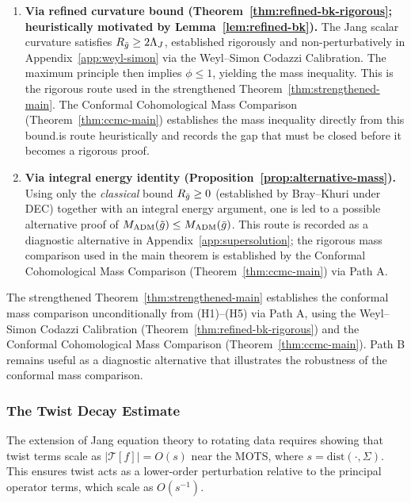 \begin{enumerate}[label=\textbf{Path \Alph*:}]
\item \textbf{Via refined curvature bound (Theorem~\ref{thm:refined-bk-rigorous}; heuristically motivated by Lemma~\ref{lem:refined-bk}).} The Jang scalar curvature satisfies $R_{\bar{g}} \geq 2\Lambda_J$, established rigorously and non-perturbatively in Appendix~\ref{app:weyl-simon} via the Weyl--Simon Codazzi Calibration. The maximum principle then implies $\phi \leq 1$, yielding the mass inequality. This is the rigorous route used in the strengthened Theorem~\ref{thm:strengthened-main}. The Conformal Cohomological Mass Comparison (Theorem~\ref{thm:ccmc-main}) establishes the mass inequality directly from this bound.is route heuristically and records the gap that must be closed before it becomes a rigorous proof.

\item \textbf{Via integral energy identity (Proposition~\ref{prop:alternative-mass}).} Using only the \emph{classical} bound $R_{\bar{g}} \geq 0$ (established by Bray--Khuri under DEC) together with an integral energy argument, one is led to a possible alternative proof of $M_{\mathrm{ADM}}(\tilde{g}) \leq M_{\mathrm{ADM}}(\bar{g})$. This route is recorded as a diagnostic alternative in Appendix~\ref{app:supersolution}; the rigorous mass comparison used in the main theorem is established by the Conformal Cohomological Mass Comparison (Theorem~\ref{thm:ccmc-main}) via Path A.
\end{enumerate}

The strengthened Theorem~\ref{thm:strengthened-main} establishes the conformal mass comparison unconditionally from (H1)--(H5) via Path A, using the Weyl--Simon Codazzi Calibration (Theorem~\ref{thm:refined-bk-rigorous}) and the Conformal Cohomological Mass Comparison (Theorem~\ref{thm:ccmc-main}). Path B remains useful as a diagnostic alternative that illustrates the robustness of the conformal mass comparison.

\subsubsection{The Twist Decay Estimate}

The extension of Jang equation theory to rotating data requires showing that twist terms scale as $|\mathcal{T}[f]| = O(s)$ near the MOTS, where $s = \mathrm{dist}(\cdot, \Sigma)$. This ensures twist acts as a lower-order perturbation relative to the principal operator terms, which scale as $O(s^{-1})$.

